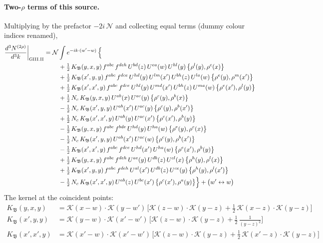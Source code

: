 \documentclass[10pt]{article}
\numberwithin{equation}{section}
\newcommand{\KK}{\mathcal K}
\newcommand{\NN}{\mathcal N}
\begin{document}
\paragraph{Two-$\rho$ terms of this source.} Multiplying by the prefactor $-2i\,\NN$ and collecting equal terms (dummy colour indices renamed),
\begin{align}
\frac{d^3N^{(2\rho)}}{d^3k}\bigg|_{\rm GIII.II}={}&\NN\int e^{-ik\cdot(w'-w)}\,\Big\{\notag\\
&\quad +\tfrac12\,K_{\mathfrak B}(y,x,y)\,f^{abc}\,f^{deh}\,U^{bd}(z)\,U^{ea}(w)\,U^{hl}(y)\,\big\{\rho^{l}(y),\rho^{c}(x)\big\}\notag\\
&\quad +\tfrac12\,K_{\mathfrak B}(x',y,y)\,f^{abc}\,f^{dce}\,U^{hd}(y)\,U^{lm}(x')\,U^{bh}(z)\,U^{la}(w)\,\big\{\rho^{e}(y),\rho^{m}(x')\big\}\notag\\
&\quad +\tfrac12\,K_{\mathfrak B}(x',x',y)\,f^{abc}\,f^{dce}\,U^{hl}(y)\,U^{md}(x')\,U^{bh}(z)\,U^{ma}(w)\,\big\{\rho^{e}(x'),\rho^{l}(y)\big\}\notag\\
&\quad +\tfrac12\,N_{c}\,K_{\mathfrak B}(y,x,y)\,U^{ab}(x)\,U^{ac}(y)\,\big\{\rho^{c}(y),\rho^{b}(x)\big\}\notag\\
&\quad -\tfrac12\,N_{c}\,K_{\mathfrak B}(x',y,y)\,U^{ab}(x')\,U^{ac}(y)\,\big\{\rho^{c}(y),\rho^{b}(x')\big\}\notag\\
&\quad +\tfrac12\,N_{c}\,K_{\mathfrak B}(x',x',y)\,U^{ab}(y)\,U^{ac}(x')\,\big\{\rho^{c}(x'),\rho^{b}(y)\big\}\notag\\
&\quad -\tfrac12\,K_{\mathfrak B}(y,x,y)\,f^{abc}\,f^{bde}\,U^{hd}(y)\,U^{ha}(w)\,\big\{\rho^{e}(y),\rho^{c}(x)\big\}\notag\\
&\quad -\tfrac12\,N_{c}\,K_{\mathfrak B}(x',y,y)\,U^{ab}(x')\,U^{ac}(w)\,\big\{\rho^{c}(y),\rho^{b}(x')\big\}\notag\\
&\quad -\tfrac12\,K_{\mathfrak B}(x',x',y)\,f^{abc}\,f^{dce}\,U^{hd}(x')\,U^{ha}(w)\,\big\{\rho^{e}(x'),\rho^{b}(y)\big\}\notag\\
&\quad +\tfrac12\,K_{\mathfrak B}(y,x,y)\,f^{abc}\,f^{deh}\,U^{ae}(y)\,U^{db}(z)\,U^{cl}(x)\,\big\{\rho^{h}(y),\rho^{l}(x)\big\}\notag\\
&\quad +\tfrac12\,K_{\mathfrak B}(x',y,y)\,f^{abc}\,f^{deh}\,U^{al}(x')\,U^{db}(z)\,U^{ce}(y)\,\big\{\rho^{h}(y),\rho^{l}(x')\big\}\notag\\
&\quad -\tfrac12\,N_{c}\,K_{\mathfrak B}(x',x',y)\,U^{ab}(z)\,U^{bc}(x')\,\big\{\rho^{c}(x'),\rho^{a}(y)\big\}\Big\}+\big(w'\leftrightarrow w\big)\label{R:eq:res-GIII.II}
\end{align}
The kernel at the coincident points:
\begin{align*}
K_{\mathfrak B}(y,x,y)&=\KK(x-w)\cdot\KK(y-w')\,\Big[\KK(z-w)\cdot\KK(y-z)+\tfrac12\,\KK(x-z)\cdot\KK(y-z)\Big]\\K_{\mathfrak B}(x',y,y)&=\KK(y-w)\cdot\KK(x'-w')\,\Big[\KK(z-w)\cdot\KK(y-z)+\tfrac12\,\frac{1}{(y-z)^2}\Big]\\K_{\mathfrak B}(x',x',y)&=\KK(x'-w)\cdot\KK(x'-w')\,\Big[\KK(z-w)\cdot\KK(y-z)+\tfrac12\,\KK(x'-z)\cdot\KK(y-z)\Big]
\end{align*}
\end{document}
